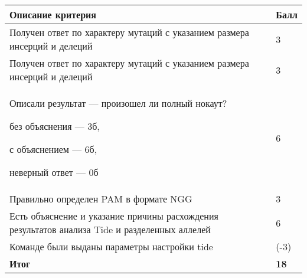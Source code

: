 \begin{tabular}{|p{11cm}|p{3cm}|}
    \hline
    \textbf{Описание критерия} & \textbf{Балл} \\
    \hline
    Получен ответ по характеру мутаций с указанием размера инсерций и делеций & 3 \\
    \hline
    Получен ответ по характеру мутаций с указанием размера инсерций и делеций & 3 \\
    \hline
    Описали результат — произошел ли полный нокаут? 
    
    без объяснения — 3б, 
    
    с объяснением — 6б, 
    
    неверный ответ — 0б & 6 \\
    \hline
    Правильно определен PAM в формате NGG & 3 \\
    \hline
    Есть объяснение и указание причины расхождения результатов анализа Tide и разделенных аллелей & 6 \\
    \hline
    Команде были выданы параметры настройки tide & (-3) \\
    \hline
    \hline
    \textbf{Итог} & \textbf{18} \\
    \hline
\end{tabular}